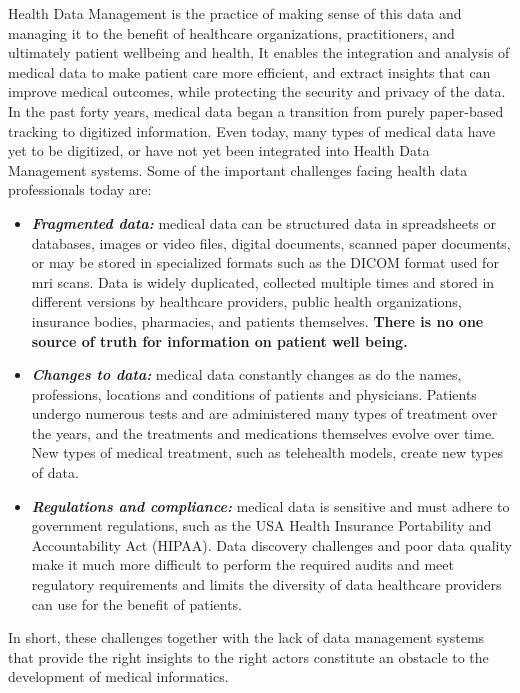 Health Data Management is the practice of making sense of this data and managing it to the benefit of healthcare organizations, practitioners, and ultimately patient wellbeing and health, It enables the integration and analysis of medical data to make patient care more efficient, and extract insights that can improve medical outcomes, while protecting the security and privacy of the data. In the past forty years, medical data began a transition from purely paper-based tracking to digitized information. Even today, many types of medical data have yet to be digitized, or have not yet been integrated into Health Data Management systems. Some of the important challenges facing health data professionals today are\cite{HealthDataManagement}:
\begin{itemize}
  \renewcommand{\labelitemi}{$\bullet$}
    \item \textbf{\textit{Fragmented data:}} medical data can be structured data in spreadsheets or databases, images or video files, digital documents, scanned paper documents, or may be stored in specialized formats such as the DICOM format used for \gls{mri} scans. Data is widely duplicated, collected multiple times and stored in different versions by healthcare providers, public health organizations, insurance bodies, pharmacies, and patients themselves. \textbf{There is no one source of truth for information on patient well being.}
    \item \textbf{\textit{Changes to data:}} medical data constantly changes as do the names, professions, locations and conditions of patients and physicians. Patients undergo numerous tests and are administered many types of treatment over the years, and the treatments and medications themselves evolve over time. New types of medical treatment, such as telehealth models, create new types of data.
    \item \textbf{\textit{Regulations and compliance:}} medical data is sensitive and must adhere to government regulations, such as the USA Health Insurance Portability and Accountability Act (HIPAA). Data discovery challenges and poor data quality make it much more difficult to perform the required audits and meet regulatory requirements and limits the diversity of data healthcare providers can use for the benefit of patients.
  \end{itemize}
  \bigbreak
  In short, these challenges together with the lack of data management systems that provide the right insights to the right actors constitute an obstacle to the development of medical informatics.




